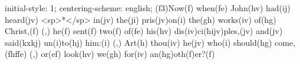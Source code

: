 initial-style: 1;
centering-scheme: english;
(f3)Now(f) when(fe) John(hv) had(ij) heard(jv) <sp>*</sp> in(jv) the(ji) pris(jv)on(i) the(gh) works(iv) of(hg) Christ,(f) (,) he(f) sent(f) two(f) of(fe) his(hv) dis(iv)ci(hijv)ples,(jv) and(jv) said(kxkj) un(i)to(hj) him:(i) (,) Art(h) thou(iv) he(jv) who(i) should(hg) come,(fhffe) (,) or(ef) look(hv) we(gh) for(iv) an(hg)oth(f)er?(f)
